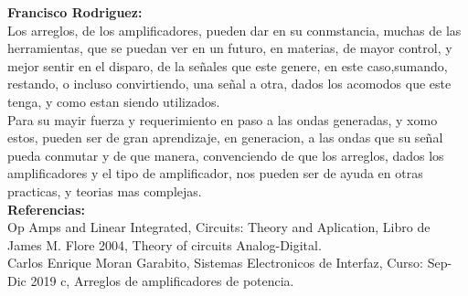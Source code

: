 \documentclass[12pt,a4paper]{article}
\begin{document}
\textbf{Francisco Rodriguez:}\\
Los arreglos, de los amplificadores, pueden dar en su conmstancia, muchas de las herramientas, que se puedan ver en un futuro, en materias, de mayor control, y mejor sentir en el disparo, de la señales que este genere, en este caso,sumando, restando, o incluso convirtiendo, una señal a otra, dados los acomodos que este tenga, y como estan siendo utilizados.\\
Para su mayir fuerza y requerimiento en paso a las ondas generadas, y xomo estos, pueden ser de gran aprendizaje, en generacion, a las ondas que su señal pueda conmutar y de que manera, convenciendo de que los arreglos, dados los amplificadores y el tipo de amplificador, nos pueden ser de ayuda en otras practicas, y teorias mas complejas.\\

\textbf{\Large Referencias:}\\

Op Amps and Linear Integrated, Circuits: Theory and Aplication, Libro de James M. Flore 2004, Theory of circuits Analog-Digital.\\

Carlos Enrique Moran Garabito, Sistemas Electronicos de Interfaz, Curso: Sep-Dic 2019 c, Arreglos de amplificadores de potencia.
\end{document}
